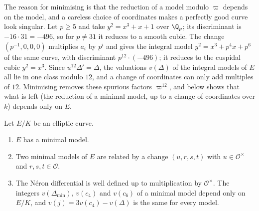 The reason for minimising is that the reduction of a model modulo $\varpi$ depends on the model, and a careless choice
of coordinates makes a perfectly good curve look singular. Let $p\ge5$ and take $y^2=x^3+x+1$ over $\Q_p$; its
discriminant is $-16\cdot31=-496$, so for $p\ne31$ it reduces to a smooth cubic. The change $(p^{-1},0,0,0)$ multiplies
$a_i$ by $p^i$ and gives the integral model $y^2=x^3+p^4x+p^6$ of the same curve, with discriminant $p^{12}\cdot(-496)$;
it reduces to the cuspidal cubic $y^2=x^3$. Since $u^{12}\Delta'=\Delta$, the valuations $v(\Delta)$ of the integral
models of $E$ all lie in one class modulo $12$, and a change of coordinates can only add multiples of $12$. Minimising
removes these spurious factors $\varpi^{12}$, and  below shows that what is left (the
reduction of a minimal model, up to a change of coordinates over $k$) depends only on $E$.

\begin{proposition}\label{prop:reduction:minimal-basic}
Let $E/K$ be an elliptic curve.
\begin{enumerate}[label=(\roman*)]
\item $E$ has a minimal model.
\item Two minimal models of $E$ are related by a change $(u,r,s,t)$ with $u\in\mathcal O^\times$ and
$r,s,t\in\mathcal O$.
\item The N\'eron differential is well defined up to multiplication by $\mathcal O^\times$. The integers
$v(\Delta_{\min})$, $v(c_4)$ and $v(c_6)$ of a minimal model depend only on $E/K$, and
$v(j)=3v(c_4)-v(\Delta)$ is the same for every model.
\end{enumerate}
\end{proposition}

